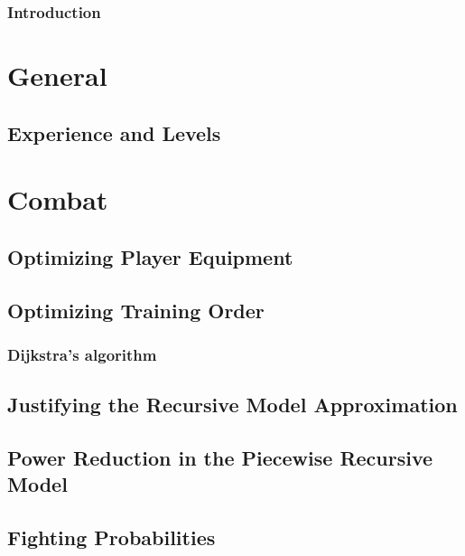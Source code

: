 \documentclass[10pt,a4paper]{report}
\begin{document}
	
	\tableofcontents
	\newpage

	\section*{Introduction}
		
	
	\part{General}
		\chapter{Experience and Levels}\label{chp:experience_and_levels}
			

	\part{Combat}
		
		
		
		
		
		\chapter{Optimizing Player Equipment}
			
		\chapter{Optimizing Training Order}
			\section{Dijkstra's algorithm}
		
		\begin{appendices}
			\chapter{Justifying the Recursive Model Approximation}\label{app:analytic_form_attempt}
				
			\chapter{Power Reduction in the Piecewise Recursive Model}
				
			\chapter{Fighting Probabilities}
				
		\end{appendices}
\end{document}
